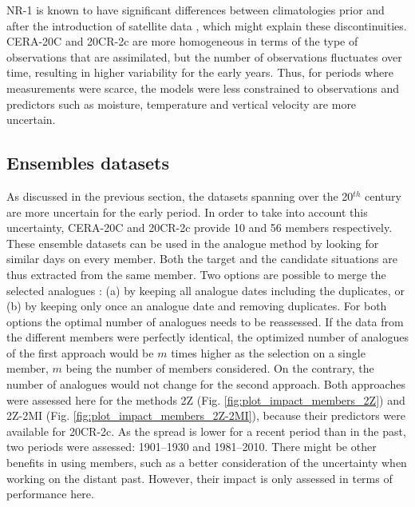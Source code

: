 \documentclass{ametsoc}
\begin{document}
NR-1 is known to have significant differences between climatologies prior and after the introduction of satellite data \citep{Kistler2001}, which might explain these discontinuities. CERA-20C and 20CR-2c are more homogeneous in terms of the type of observations that are assimilated, but the number of observations fluctuates over time, resulting in higher variability for the early years. Thus, for periods where measurements were scarce, the models were less constrained to observations and predictors such as moisture, temperature and vertical velocity are more uncertain.


\subsection{Ensembles datasets}
\label{sec:ensemble}

As discussed in the previous section, the datasets spanning over the 20$^{th}$ century are more uncertain for the early period. In order to take into account this uncertainty, CERA-20C and 20CR-2c provide 10 and 56 members respectively. These ensemble datasets can be used in the analogue method by looking for similar days on every member. Both the target and the candidate situations are thus extracted from the same member. Two options are possible to merge the selected analogues : (a) by keeping all analogue dates including the duplicates, or (b) by keeping only once an analogue date and removing duplicates. For both options the optimal number of analogues needs to be reassessed. If the data from the different members were perfectly identical, the optimized number of analogues of the first approach would be $m$ times higher as the selection on a single member, $m$ being the number of members considered. On the contrary, the number of analogues would not change for the second approach. Both approaches were assessed here for the methods 2Z (Fig. \ref{fig:plot_impact_members_2Z}) and 2Z-2MI (Fig. \ref{fig:plot_impact_members_2Z-2MI}), because their predictors were available for 20CR-2c. As the spread is lower for a recent period than in the past, two periods were assessed: 1901--1930 and 1981--2010. There might be other benefits in using members, such as a better consideration of the uncertainty when working on the distant past. However, their impact is only assessed in terms of performance here.
\end{document}
